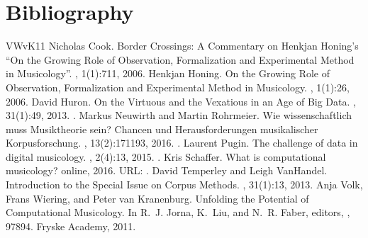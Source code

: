 \documentclass[letterpaper,10pt,english]{sphinxmanual}
\begin{document}
\chapter{Bibliography}
\label{\detokenize{bibliography:bibliography}}\label{\detokenize{bibliography::doc}}


\begin{sphinxthebibliography}{VWvK11}
Nicholas Cook. Border Crossings: A Commentary on Henkjan Honing’s “On the Growing Role of Observation, Formalization and Experimental Method in Musicology”. , 1(1):7\textendash{}11, 2006.
Henkjan Honing. On the Growing Role of Observation, Formalization and Experimental Method in Musicology. , 1(1):2\textendash{}6, 2006.
David Huron. On the Virtuous and the Vexatious in an Age of Big Data. , 31(1):4\textendash{}9, 2013. .
Markus Neuwirth and Martin Rohrmeier. Wie wissenschaftlich muss Musiktheorie sein? Chancen und Herausforderungen musikalischer Korpusforschung. , 13(2):171\textendash{}193, 2016. .
Laurent Pugin. The challenge of data in digital musicology. , 2(4):1\textendash{}3, 2015. .
Kris Schaffer. What is computational musicology? online, 2016. URL: .
David Temperley and Leigh VanHandel. Introduction to the Special Issue on Corpus Methods. , 31(1):1\textendash{}3, 2013.
Anja Volk, Frans Wiering, and Peter van Kranenburg. Unfolding the Potential of Computational Musicology. In R. J. Jorna, K. Liu, and N. R. Faber, editors, , 978\textendash{}94. Fryske Academy, 2011.
\end{sphinxthebibliography}



\renewcommand{\indexname}{Index}
\printindex
\end{document}
